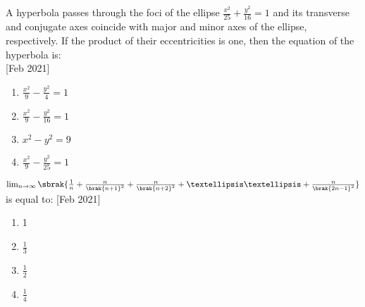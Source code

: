     \item{
            A hyperbola passes through the foci of the ellipse $\frac{x^2}{25} + \frac{y^2}{16} = 1$ and its transverse and conjugate axes coincide with major and minor axes of the ellipse, respectively. If the product of their eccentricities is one, then the equation of the hyperbola is:\\ \text{ }
             \hfill
                {[Feb 2021]}
            \begin{multicols}{2}
                \begin{enumerate}
                    \item $\frac{x^2}{9} - \frac{y^2}{4} = 1$
                    
                    \item $\frac{x^2}{9} - \frac{y^2}{16} = 1$
                    
                    \item $x^2 - y^2 = 9$
                    
                    \item $\frac{x^2}{9} - \frac{y^2}{25} = 1$
                \end{enumerate}
            \end{multicols}

        
        }
    \item{
            $\lim_{n \rightarrow \infty}\sbrak{\frac{1}{n} + \frac{n}{\brak{n+1}^2} + \frac{n}{\brak{n+2}^2} +……+ \frac{n}{\brak{2n-1}^2}}$ is equal to: 
             \hfill
                {[Feb 2021]}
            \begin{multicols}{4}
                \begin{enumerate}
                	\item 1
                	\item $\frac{1}{3}$
                	\item $\frac{1}{2}$
                	\item $\frac{1}{4}$
                \end{enumerate}
            \end{multicols}
        
        }

